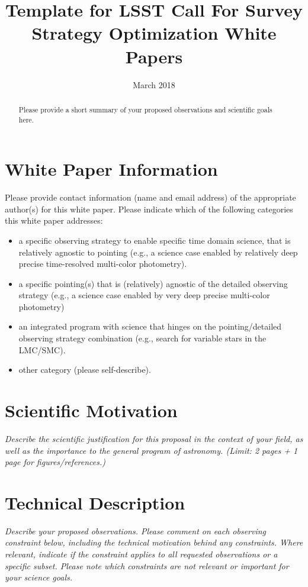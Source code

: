 \documentclass[11pt]{article}
\title{Template for LSST Call For Survey Strategy Optimization White Papers}
\author{}
\date{March 2018}
\begin{document}
\maketitle

\begin{abstract}
Please provide a short summary of your proposed observations and scientific goals here.
\end{abstract}

\section{White Paper Information}
Please provide contact information (name and email address) of the appropriate author(s) for this white paper.
Please indicate which of the following categories this white paper addresses:
\begin{itemize} 
\item a specific observing strategy to enable specific time domain science, 
	that is relatively agnostic to pointing (e.g., a science case enabled 
	by relatively deep precise time-resolved multi-color photometry). 
\item a specific pointing(s) that is (relatively) agnostic of the detailed observing 
	strategy (e.g., a science case enabled by very deep precise multi-color 
	photometry) 
\item an integrated program with science that hinges on the pointing/detailed 
	observing strategy combination (e.g., search for variable stars in the 
	LMC/SMC). 
\item other category (please self-describe). 
\end{itemize}  

\clearpage

\section{Scientific Motivation}

\begin{footnotesize}
{\it Describe the scientific justification for this proposal in the context
of your field, as well as the importance to the general program of astronomy. 
(Limit: 2 pages + 1 page for figures/references.)}
\end{footnotesize}

\vspace{.6in}

\section{Technical Description}
\begin{footnotesize}
{\it Describe your proposed observations. Please comment on each observing constraint
below, including the technical motivation behind any constraints. Where relevant, indicate
if the constraint applies to all requested observations or a specific subset. Please note which 
constraints are not relevant or important for your science goals.}
\end{footnotesize}
\end{document}
